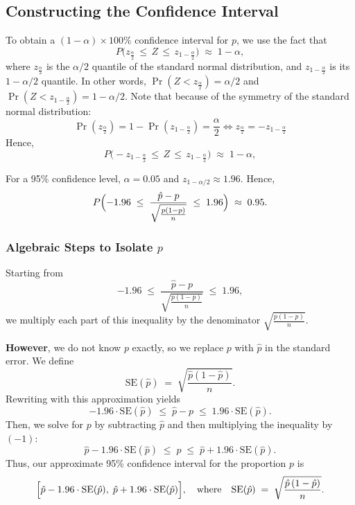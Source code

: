 \documentclass[11pt]{article}
\begin{document}
\subsection*{Constructing the Confidence Interval}

To obtain a \((1-\alpha) \times 100\%\) confidence interval for \(p\), we use the fact that
\[
  P\!\bigl(z_{\frac{\alpha}{2}} \,\le\, Z \,\le\, z_{1-\frac{\alpha}{2}}\bigr) \;\approx\; 1 - \alpha,
\]
where \(z_{\frac{\alpha}{2}}\) is the \(\alpha/2\) quantile of the standard normal distribution, and  \(z_{1-\frac{\alpha}{2}}\) is its \(1-\alpha/2\) quantile. In other words, \( \Pr(Z<z_{\frac{\alpha}{2}})=\alpha/2 \) and \( \Pr( Z < z_{1-\frac{\alpha}{2}} )=1-\alpha/2 \). Note that because of the symmetry of the standard normal distribution:
\[
\Pr(z_{\frac{\alpha}{2}})  = 1 - \Pr(z_{1-\frac{\alpha}{2}}) = \dfrac{\alpha}{2} \iff    z_{\frac{\alpha}{2}}  = - z_{1-\frac{\alpha}{2}} 
\]
Hence,
\[
  P\!\bigl(-z_{1-\frac{\alpha}{2}}  \,\le\, Z \,\le\, z_{1-\frac{\alpha}{2}} \bigr) \;\approx\; 1 - \alpha,
\]

For a 95\% confidence level, \(\alpha = 0.05\) and \(z_{1-\alpha/2} \approx 1.96\). Hence,
\[
  P\Bigl(-1.96 \;\le\;
  \frac{\hat{p} - p}{\sqrt{\frac{p(1-p)}{n}}}
  \;\le\; 1.96\Bigr)
  \;\approx\; 0.95.
\]

\subsubsection*{Algebraic Steps to Isolate \(p\)}

Starting from
\[
  -1.96 
  \;\le\;
  \frac{\hat{p} - p}{\sqrt{\frac{p(1-p)}{n}}}
  \;\le\;
  1.96,
\]
we multiply each part of this inequality by the denominator \(\sqrt{\frac{p(1-p)}{n}}.\)

\textbf{However}, we do not know \(p\) exactly, so we replace \(p\) with \(\hat{p}\) in the standard error. We define
\[
  \text{SE}(\hat{p}) \;=\; \sqrt{\frac{\hat{p}(1-\hat{p})}{n}}.
\]
Rewriting with this approximation yields
\[
  -1.96 \cdot \text{SE}(\hat{p})
  \;\le\;
  \hat{p} - p
  \;\le\;
  1.96 \cdot \text{SE}(\hat{p}).
\]
Then, we solve for \(p\) by subtracting \(\hat{p}\) and then multiplying the inequality by $(-1)$:
\[
  \hat{p} - 1.96  \cdot \text{SE}(\hat{p}) 
  \;\le\;
  p 
  \;\le\;
  \hat{p} + 1.96  \cdot \text{SE}(\hat{p}).
\]
Thus, our approximate 95\% confidence interval for the proportion \(p\) is
\[
  \Bigl[
    \hat{p} - 1.96 \cdot \text{SE}(\hat{p}), \;
    \hat{p} + 1.96 \cdot \text{SE}(\hat{p})
  \Bigr],
  \quad
  \text{where}
  \quad
  \text{SE}(\hat{p}) 
  \;=\;
  \sqrt{\frac{\hat{p}\,(1-\hat{p})}{n}}.
\]
\end{document}
